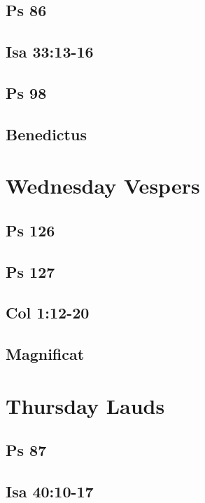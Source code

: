 \subsection{Ps 86}

\subsection{Isa 33:13-16}

\subsection{Ps 98}

\subsection{Benedictus}


\section{Wednesday Vespers}

\subsection{Ps 126}

\subsection{Ps 127}

\subsection{Col 1:12-20}

\subsection{Magnificat}


\section{Thursday Lauds}

\subsection{Ps 87}

\subsection{Isa 40:10-17}

